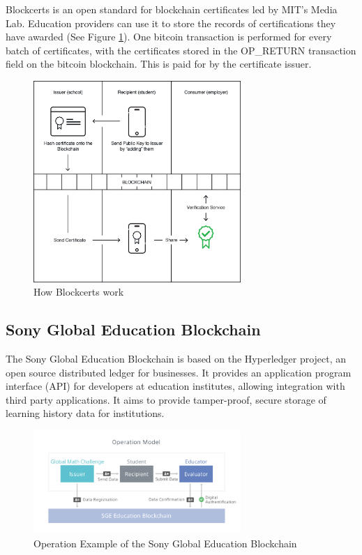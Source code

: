 Blockcerts is an open standard for blockchain certificates led by MIT’s Media Lab. Education providers can use it to store 
the records of certifications they have awarded (See Figure \ref{fig:blockcerts}). One bitcoin transaction is performed for 
every batch of certificates, with the certificates stored in the OP\_RETURN transaction field on the bitcoin blockchain. 
This is paid for by the certificate issuer. \citep{blockcerts2018}

\begin{figure}[!ht] 
    \centering    
    \includegraphics[width=0.7\textwidth]{blockcerts}
    \caption[How Blockcerts work]
        {How Blockcerts work \citep{blockcerts2018}}
    \label{fig:blockcerts}
\end{figure}

\subsection{Sony Global Education Blockchain}%

The Sony Global Education Blockchain is based on the Hyperledger project, an open source distributed ledger 
for businesses. It provides an application program interface (API) for developers at education institutes, 
allowing integration with third party applications. It aims to provide tamper-proof, secure storage of 
learning history data for institutions. \citep{sonyged2017}

\begin{figure}[!ht] 
    \centering    
    \includegraphics[width=0.7\textwidth]{sonyged}
    \caption[Sony Global Education Blockchain]
        {Operation Example of the Sony Global Education Blockchain \citep{sonyged2017}}
    \label{fig:sonyged}
\end{figure}

